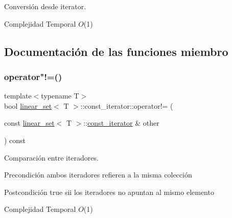 Conversión desde iterator. 


\begin{DoxyDescription}
\item[Complejidad Temporal]$O$(1)
\end{DoxyDescription}

\subsection{Documentación de las funciones miembro}
\mbox{\label{classlinear__set_1_1const__iterator_ac06879120ff039d22ce9999cb0a7c6ec}} 
\subsubsection{\texorpdfstring{operator"!=()}{operator!=()}}
{\footnotesize\ttfamily template$<$typename T$>$ \\
bool \mbox{\hyperlink{classlinear__set}{linear\+\_\+set}}$<$ T $>$\+::const\+\_\+iterator\+::operator!= (\begin{DoxyParamCaption}\item[{const \mbox{\hyperlink{classlinear__set}{linear\+\_\+set}}$<$ T $>$\+::\mbox{\hyperlink{classlinear__set_1_1const__iterator}{const\+\_\+iterator}} \&}]{other }\end{DoxyParamCaption}) const}



Comparación entre iteradores. 

\begin{DoxyPrecond}{Precondición}
ambos iteradores refieren a la misma colección 
\end{DoxyPrecond}
\begin{DoxyPostcond}{Postcondición}
true sii los iteradores no apuntan al mismo elemento
\end{DoxyPostcond}

\begin{DoxyDescription}
\item[Complejidad Temporal]$O$(1)
\end{DoxyDescription}\mbox{\label{classlinear__set_1_1const__iterator_a46a3d8f257692df315fcf391a9ee2a33}} 
